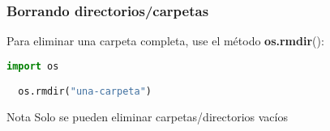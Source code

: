 \begin{frame}[fragile]
  \frametitle{Borrando directorios/carpetas}

  Para eliminar una carpeta completa, use el método \textbf{os.rmdir}():

  \vspace{\baselineskip}
  \begin{lstlisting}[language=Python]
  import os

  os.rmdir("una-carpeta")
  \end{lstlisting}

  \vspace{\baselineskip}
  \begin{exampleblock}{Nota}
    Solo se pueden eliminar carpetas/directorios vacíos
  \end{exampleblock}
\end{frame}
